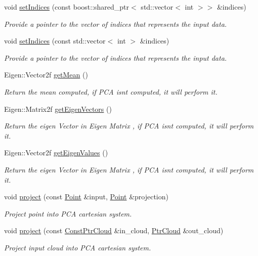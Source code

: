 \begin{DoxyCompactItemize}
void \hyperlink{classPCA2D_a4e7f046e1198928994dfc40a4c3be40e}{set\+Indices} (const boost\+::shared\+\_\+ptr$<$ std\+::vector$<$ int $>$$>$ \&indices)
\begin{DoxyCompactList}\small\item\em Provide a pointer to the vector of indices that represents the input data. \end{DoxyCompactList}\item 
void \hyperlink{classPCA2D_aa5b9ccb12b5ce673ac851a2a5c4f4f97}{set\+Indices} (const std\+::vector$<$ int $>$ \&indices)
\begin{DoxyCompactList}\small\item\em Provide a pointer to the vector of indices that represents the input data. \end{DoxyCompactList}\item 
Eigen\+::\+Vector2f \hyperlink{classPCA2D_a35ed9e55a614bb7fd87025945867cffa}{get\+Mean} ()
\begin{DoxyCompactList}\small\item\em Return the mean computed, if P\+CA isn\textquotesingle{}t computed, it will perform it. \end{DoxyCompactList}\item 
Eigen\+::\+Matrix2f \hyperlink{classPCA2D_a2243f1d03a734f7cf4f9f959f494a2e0}{get\+Eigen\+Vectors} ()
\begin{DoxyCompactList}\small\item\em Return the eigen Vector in Eigen Matrix , if P\+CA isn\textquotesingle{}t computed, it will perform it. \end{DoxyCompactList}\item 
Eigen\+::\+Vector2f \hyperlink{classPCA2D_ace26902adea167c5aef9a3219ceafbd3}{get\+Eigen\+Values} ()
\begin{DoxyCompactList}\small\item\em Return the eigen Vector in Eigen Matrix , if P\+CA isn\textquotesingle{}t computed, it will perform it. \end{DoxyCompactList}\item 
void \hyperlink{classPCA2D_a9768dbce5a3b9cd0b3aacbedc3301884}{project} (const \hyperlink{Normal2dEstimation_8h_ab8d898f36957cca40634530a6f118a3e}{Point} \&input, \hyperlink{Normal2dEstimation_8h_ab8d898f36957cca40634530a6f118a3e}{Point} \&projection)
\begin{DoxyCompactList}\small\item\em Project point into P\+CA cartesian system. \end{DoxyCompactList}\item 
void \hyperlink{classPCA2D_ac36f8aacab8d6fe1d804f17cfa7b0f78}{project} (const \hyperlink{Normal2dEstimation_8h_a389a43addc496dc19a5bb0575cc60bc4}{Const\+Ptr\+Cloud} \&in\+\_\+cloud, \hyperlink{Normal2dEstimation_8h_a2894055ff89c63cbae90e22dfddaa610}{Ptr\+Cloud} \&out\+\_\+cloud)
\begin{DoxyCompactList}\small\item\em Project input cloud into P\+CA cartesian system. \end{DoxyCompactList}\end{DoxyCompactItemize}


